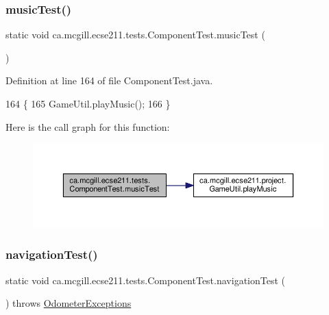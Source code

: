 \subsubsection{\texorpdfstring{music\+Test()}{musicTest()}}
{\footnotesize\ttfamily static void ca.\+mcgill.\+ecse211.\+tests.\+Component\+Test.\+music\+Test (\begin{DoxyParamCaption}{ }\end{DoxyParamCaption})\hspace{0.3cm}{\ttfamily [static]}}



Definition at line 164 of file Component\+Test.\+java.


\begin{DoxyCode}
164                                  \{
165     GameUtil.playMusic();
166   \}
\end{DoxyCode}
Here is the call graph for this function\+:
\nopagebreak
\begin{figure}[H]
\begin{center}
\leavevmode
\includegraphics[width=350pt]{enumca_1_1mcgill_1_1ecse211_1_1tests_1_1_component_test_a743c9bb90a8c8bc3fcf3b4c591990e7f_cgraph}
\end{center}
\end{figure}
\mbox{\label{enumca_1_1mcgill_1_1ecse211_1_1tests_1_1_component_test_aa40592bb550b3526402faddbc0d890c7}} 
\subsubsection{\texorpdfstring{navigation\+Test()}{navigationTest()}}
{\footnotesize\ttfamily static void ca.\+mcgill.\+ecse211.\+tests.\+Component\+Test.\+navigation\+Test (\begin{DoxyParamCaption}{ }\end{DoxyParamCaption}) throws \hyperlink{classca_1_1mcgill_1_1ecse211_1_1odometer_1_1_odometer_exceptions}{Odometer\+Exceptions}\hspace{0.3cm}{\ttfamily [static]}}


